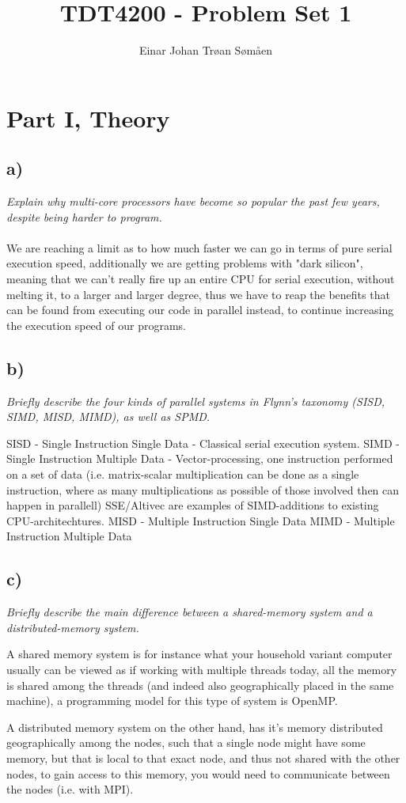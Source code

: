 \documentclass{article}
\title{TDT4200 - Problem Set 1}
\author{Einar Johan Trøan Sømåen}
\begin{document}
\maketitle

\section{Part I, Theory}
\subsection*{a)} \textit{Explain why multi-core processors have become so popular the past few years, despite being harder
to program.}
\\\\
We are reaching a limit as to how much faster we can go in terms of pure serial execution speed, additionally we are getting problems with "dark silicon", meaning that we can't really fire up an entire CPU for serial execution, without melting it, to a larger and larger degree, thus we have to reap the benefits that can be found from executing our code in parallel instead, to continue increasing the execution speed of our programs.

\subsection*{b)} \textit{Briefly describe the four kinds of parallel systems in Flynn’s taxonomy (SISD, SIMD, MISD, MIMD),
as well as SPMD.}

SISD - Single Instruction Single Data - Classical serial execution system.
SIMD - Single Instruction Multiple Data - Vector-processing, one instruction performed on a set of data (i.e. matrix-scalar multiplication can be done as a single instruction, where as many multiplications as possible of those involved then can happen in parallell) SSE/Altivec are examples of SIMD-additions to existing CPU-architechtures.
MISD - Multiple Instruction Single Data
MIMD - Multiple Instruction Multiple Data

\subsection*{c)} \textit{Briefly describe the main difference between a shared-memory system and a distributed-memory
system.}

A shared memory system is for instance what your household variant computer usually can be viewed as if working with multiple threads today, all the memory is shared among the threads (and indeed also geographically placed in the same machine), a programming model for this type of system is OpenMP.

A distributed memory system on the other hand, has it's memory distributed geographically among the nodes, such that a single node might have some memory, but that is local to that exact node, and thus not shared with the other nodes, to gain access to this memory, you would need to communicate between the nodes (i.e. with MPI).
\end{document}
